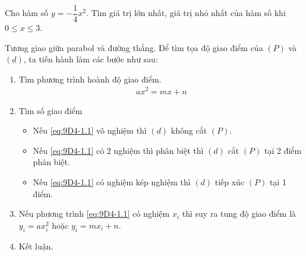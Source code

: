 \begin{vd}
	Cho hàm số $ y = -\dfrac{1}{4}x^2 $. Tìm giá trị lớn nhất, giá trị nhỏ nhất của hàm số khi $ 0 \leqslant x \leqslant 3 $.
\end{vd}

\begin{dang}{Tương giao giữa parabol và đường thẳng.}
	Để tìm tọa độ giao điểm của $ (P) $ và $ (d) $, ta tiến hành làm các bước như sau:
	\begin{enumerate}[Bước 1:]
		\item Tìm phương trình hoành độ giao điểm.
		\begin{align}
			ax^2 = mx + n \label{eq:9D4-1.1}
		\end{align}
		\item Tìm số giao điểm
		\begin{itemize}
			\item Nếu \eqref{eq:9D4-1.1} vô nghiệm thì $ (d) $ không cắt $ (P) $.
			\item Nếu \eqref{eq:9D4-1.1} có 2 nghiệm thì phân biệt thì $ (d) $ cắt $ (P) $ tại 2 điểm phân biệt.
			\item Nếu \eqref{eq:9D4-1.1} có nghiệm kép nghiệm thì $ (d) $ tiếp xúc $ (P) $ tại 1 điểm.
		\end{itemize}
		\item Nếu phương trình \eqref{eq:9D4-1.1} có nghiệm $ x_i $ thì suy ra tung độ giao điểm là $ y_i = ax_i^2 $ hoặc $ y_i = mx_i + n $.
		\item Kết luận.
	\end{enumerate}
\end{dang}

